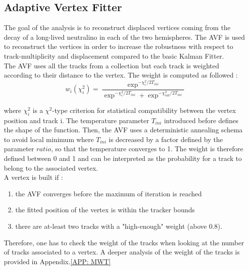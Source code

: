 \documentclass{cernatlasnote}
\begin{document}
\begin{appendices}
\FloatBarrier

\pagebreak
\section{Adaptive Vertex Fitter}
\label{APP: AVF}
The goal of the analysis is to reconstruct displaced vertices coming from the decay of a long-lived neutralino in each of the two hemispheres. The AVF is used to reconstruct the vertices in order to increase the robustness with respect to track-multiplicity and displacement compared to the basic Kalman Fitter. \\
The AVF uses all the tracks from a collection but each track is weighted according to their distance to the vertex. The weight is computed as followed :
\begin{equation}
        w_{i}(\chi^{2}_{i})= \frac{  \exp^{-\chi^{2}_{i}/2T_{ini}}  }{\exp^{-\chi^{2}_{i}/2T_{ini}} + \exp^{-\chi^{2}_{cut}/2T_{ini}}}
\end{equation}

where $\chi^{2}_{i}$ is a $\chi^{2}$-type criterion for statistical compatibility between the vertex position and track i. The temperature parameter $T_{ini}$ introduced before defines the shape of the function. Then, the AVF uses a deterministic annealing schema to avoid local minimum where $T_{ini}$ is decreased by a factor defined by the parameter $ratio$, so that the temperature converges to 1. The weight is therefore defined between 0 and 1 and can be interpreted as the probability for a track to belong to the associated vertex. \\

A vertex is built if :
    \begin{enumerate}
        \item the AVF converges before the maximum of iteration is reached
        \item the fitted position of the vertex is within the tracker bounds
        \item there are at-least two tracks with a "high-enough" weight (above 0.8). 
    \end{enumerate}

Therefore, one has to check the weight of the tracks when looking at the number of tracks associated  to a vertex. A deeper analysis of the weight of the tracks is provided in Appendix.\ref{APP: MWT}


\end{appendices}
\end{document}
